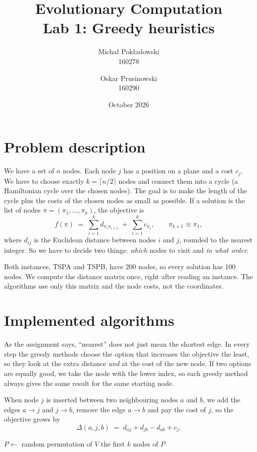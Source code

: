 \documentclass[11pt,a4paper]{article}
\title{Evolutionary Computation\\[0.3em]\large Lab 1: Greedy heuristics}
\author{Michał Pokładowski\\ \small 160278 \and Oskar Prusinowski\\ \small 160290}
\date{October 2026}
\begin{document}
\maketitle

\section{Problem description}

We have a set of $n$ nodes. Each node $j$ has a position on a plane and a cost
$c_j$. We have to choose exactly $k = \lceil n/2 \rceil$ nodes and connect them
into a cycle (a Hamiltonian cycle over the chosen nodes). The goal is to make
the length of the cycle plus the costs of the chosen nodes as small as
possible. If a solution is the list of nodes $\pi = (\pi_1, \dots, \pi_k)$, the
objective is
\[
  f(\pi) \;=\; \sum_{i=1}^{k} d_{\pi_i \pi_{i+1}} \;+\; \sum_{i=1}^{k} c_{\pi_i},
  \qquad \pi_{k+1} \equiv \pi_1 ,
\]
where $d_{ij}$ is the Euclidean distance between nodes $i$ and $j$, rounded to
the nearest integer. So we have to decide two things: \emph{which} nodes to
visit and \emph{in what order}.

Both instances, TSPA and TSPB, have 200 nodes, so every solution has 100 nodes.
We compute the distance matrix once, right after reading an instance. The
algorithms use only this matrix and the node costs, not the coordinates.

\section{Implemented algorithms}

As the assignment says, ``nearest'' does not just mean the shortest edge. In
every step the greedy methods choose the option that increases the objective
the least, so they look at the extra distance \emph{and} at the cost of the new
node. If two options are equally good, we take the node with the lower index,
so each greedy method always gives the same result for the same starting node.

When node $j$ is inserted between two neighbouring nodes $a$ and $b$, we add
the edges $a \to j$ and $j \to b$, remove the edge $a \to b$ and pay the cost of
$j$, so the objective grows by
\[
  \Delta(a, j, b) \;=\; d_{aj} + d_{jb} - d_{ab} + c_j .
\]

\begin{algorithm}[H]
\caption{Random solution}
\begin{algorithmic}[1]
\State $P \gets$ random permutation of $V$
\State \Return the first $k$ nodes of $P$
\end{algorithmic}
\end{algorithm}
\end{document}
